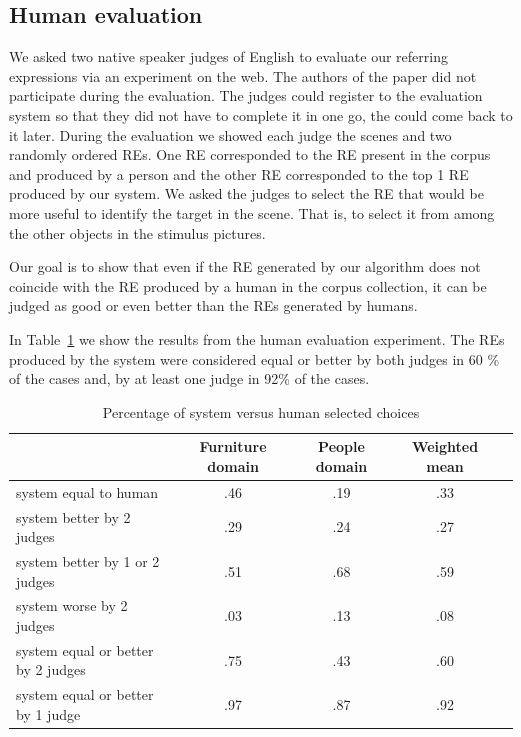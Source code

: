  
\vspace*{-1.0cm}

\subsection{Human evaluation} \label{sec:humanevaluation}

We asked two native speaker judges of English to evaluate our referring expressions via an experiment on the web. The authors of the paper did not participate during the evaluation. The judges could register to the evaluation system so that they did not have to complete it in one go, the could come back to it later. During the evaluation we showed each judge the scenes and two randomly ordered REs. One RE corresponded to the RE present in the corpus and produced by a person and the other RE corresponded to the top 1 RE produced by our system. We asked the judges to select the RE that would be more useful to identify the target in the scene. That is, to select it from among the other objects in the stimulus pictures. 

Our goal is to show that even if the RE generated by our algorithm does not coincide with the RE produced by a human in the corpus collection, it can be judged as good or even better than the REs generated by humans. 

In Table~\ref{system-versus-human} we show the results from the human evaluation experiment.
The REs produced by the system were considered equal or better by both
judges in 60 \% of the cases and, by at least one judge in 92\% of the cases.

\begin{table}[h!]
\begin{center}
\begin{tabular}{|l|c|c|c|c|}
\hline
 & Furniture domain & People domain & Weighted mean \\
\hline
system equal to human  	&	.46	&	.19	&	.33 \\
system better by 2 judges &	.29 	& 	.24 	& 	.27 \\
system better by 1 or 2 judges & .51	&	.68	&	.59 \\
system worse by 2 judges &	.03	&	.13	&	.08 \\
system equal or better by 2 judges  &.75  &       .43	&       .60 \\
system equal or better by 1 judge  &.97	&	.87	&	.92 \\
\hline
\end{tabular}
\caption{Percentage of system versus human selected choices} 
\label{system-versus-human}
\vspace*{-.5cm}
\end{center}
\end{table}

